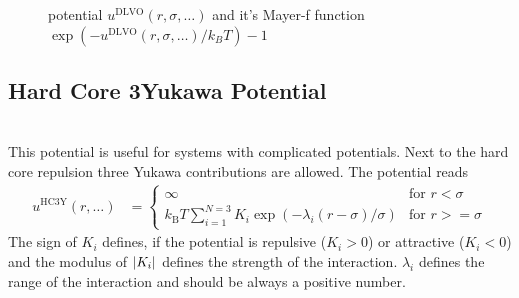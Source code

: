 \begin{figure}[htb]
\centering
  \quad
  \caption{potential $u^\text{DLVO}(r,\sigma,\ldots)$ and it's Mayer-f function $\exp(-u^\text{DLVO}(r,\sigma,\ldots)/k_BT)-1$}
\end{figure}

\newpage
\subsection{Hard Core 3Yukawa Potential}
~\\

This potential is useful for systems with complicated potentials. Next to the hard core repulsion three
Yukawa contributions are allowed. The potential reads
\begin{align}
u^\text{HC3Y}(r,\ldots) &=
\begin{cases}
\infty                                                                  & \mbox{for } r<   \sigma \\
k_\text{B} T
\displaystyle \sum_{i=1}^{N=3} K_i\exp\left(-\lambda_i(r-\sigma)/\sigma\right)& \mbox{for } r >= \sigma
\end{cases}
\end{align}
The sign of $K_i$ defines, if the potential is
repulsive ($K_i>0$) or attractive ($K_i<0$) and the modulus of $\abs{K_i}$ defines the strength of the interaction. $\lambda_i$ defines the range of the interaction and should be always a positive number.


